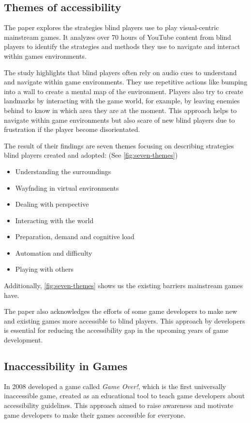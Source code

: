 \documentclass[sigconf,natbib=false,10pt]{acmart}
\begin{document}
	\subsection{Themes of accessibility}
	The paper \textcite{goncalves_my_2023} explores the strategies blind players use to play visual-centric mainstream games.
	It analyzes over 70 hours of YouTube content from blind players to identify the strategies and methods they use to navigate and interact within games environments.
	
	The study highlights that blind players often rely on audio cues to understand and navigate within game environments.
	They use repetitive actions like bumping into a wall to create a mental map of the environment.
	Players also try to create landmarks by interacting with the game world, for example, by leaving enemies behind to know in which area they are at the moment.
	This approach helps to navigate within game environments but also scare of new blind players due to frustration if the player become disorientated.
	
	The result of their findings are seven themes focusing on describing strategies blind players created and adopted: (See \autoref{fig:seven-themes})
	
	\begin{itemize}
		\setlength\itemsep{0.5em}
		\item Understanding the surroundings
		\item Wayfnding in virtual environments
		\item Dealing with perspective
		\item Interacting with the world
		\item Preparation, demand and cognitive load
		\item Automation and difficulty
		\item Playing with others
	\end{itemize}

	Additionally, \autoref{fig:seven-themes} shows us the existing barriers mainstream games have.
	
	The paper also acknowledges the efforts of some game developers to make new and existing games more accessible to blind players.
	This approach by developers is essential for reducing the accessibility gap in the upcoming years of game development.
	
	\subsection{Inaccessibility in Games}
	In 2008 \textcite{grammenos_game_2008} developed a game called \emph{Game Over!}, which is the first universally inaccessible game, created as an educational tool to teach game developers about accessibility guidelines.
	This approach aimed to raise awareness and motivate game developers to make their games accessible for everyone.
	
\end{document}
